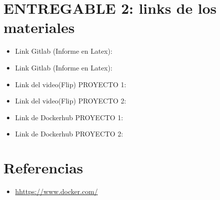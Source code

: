 \documentclass{article}
\begin{document}
\section{ENTREGABLE 2: links de los materiales}
    \begin{itemize}	
        \item Link Gitlab (Informe en Latex):
        \item Link Gitlab (Informe en Latex):
    \item Link del video(Flip) PROYECTO 1: 
    \item Link del video(Flip) PROYECTO 2: 
    \item Link de Dockerhub PROYECTO 1:  
    \item Link de Dockerhub PROYECTO 2:  
\end{itemize}










   
\section{Referencias}
\begin{itemize}			
	\item \url{hhttps://www.docker.com/}
\end{itemize}	
	
%
%
%
			
\end{document}
